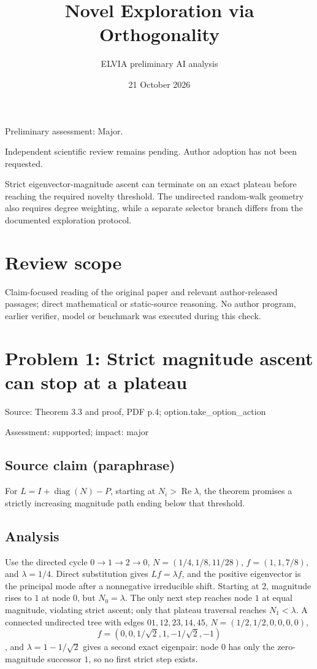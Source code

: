 \documentclass[11pt]{article}
\begin{document}
\title{Novel Exploration via Orthogonality}

\author{ELVIA preliminary AI analysis}\date{21 October 2026}\maketitle

Preliminary assessment: Major.\par

Independent scientific review remains pending. Author adoption has not been requested.

Strict eigenvector-magnitude ascent can terminate on an exact plateau before reaching the required novelty threshold. The undirected random-walk geometry also requires degree weighting, while a separate selector branch differs from the documented exploration protocol.

\section*{Review scope}

Claim-focused reading of the original paper and relevant author-released passages; direct mathematical or static-source reasoning. No author program, earlier verifier, model or benchmark was executed during this check.

\section*{Problem 1: Strict magnitude ascent can stop at a plateau}

Source: Theorem 3.3 and proof, PDF p.4; option.take\_option\_action

Assessment: supported; impact: major

\subsection*{Source claim (paraphrase)}

For \(L=I+\operatorname{diag}(N)-P\), starting at \(N_i>\operatorname{Re}\lambda\), the theorem promises a strictly increasing magnitude path ending below that threshold.

\subsection*{Analysis}

Use the directed cycle \(0\to1\to2\to0\), \(N=(1/4,1/8,11/28)\), \(f=(1,1,7/8)\), and \(\lambda=1/4\). Direct substitution gives \(Lf=\lambda f\), and the positive eigenvector is the principal mode after a nonnegative irreducible shift. Starting at \(2\), magnitude rises to \(1\) at node \(0\), but \(N_0=\lambda\). The only next step reaches node \(1\) at equal magnitude, violating strict ascent; only that plateau traversal reaches \(N_1<\lambda\). A connected undirected tree with edges \(01,12,23,14,45\), \(N=(1/2,1/2,0,0,0,0)\), \[f=(0,0,1/\sqrt2,1,-1/\sqrt2,-1)\], and \(\lambda=1-1/\sqrt2\) gives a second exact eigenpair: node \(0\) has only the zero-magnitude successor \(1\), so no first strict step exists.
\end{document}
